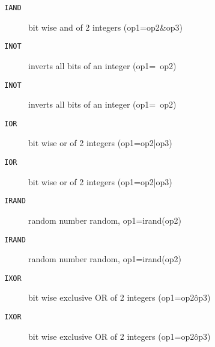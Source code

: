
\begin{description}
\item[\texttt{IAND       }]  bit wise and of 2 integers (op1=op2\&op3)\\
\end{description}

\begin{description}
\item[\texttt{INOT       }]  inverts all bits of an integer (op1=~op2)\\
\end{description}

\begin{description}
\item[\texttt{INOT       }]  inverts all bits of an integer (op1=~op2)\\
\end{description}

\begin{description}
\item[\texttt{IOR        }]  bit wise or of 2 integers (op1=op2|op3)\\
\end{description}

\begin{description}
\item[\texttt{IOR        }]  bit wise or of 2 integers (op1=op2|op3)\\
\end{description}

\begin{description}
\item[\texttt{IRAND      }]  random number random, op1=irand(op2)\\
\end{description}

\begin{description}
\item[\texttt{IRAND      }]  random number random, op1=irand(op2)\\
\end{description}

\begin{description}
\item[\texttt{IXOR       }]  bit wise exclusive OR of 2 integers (op1=op2\^op3)\\
\end{description}

\begin{description}
\item[\texttt{IXOR       }]  bit wise exclusive OR of 2 integers (op1=op2\^op3)\\
\end{description}
